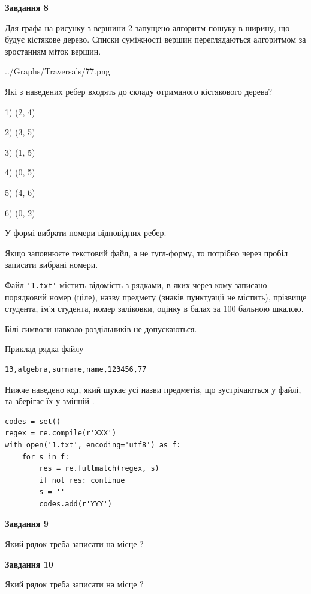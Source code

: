 \documentclass[12pt, ukrainian]{article}
\def\code#1{\Verb!#1!}
\begin{document}
{\begin {large}
{\begin {center}\textbf{Завдання 8}\end {center}}\par
Для графа на рисунку з вершини 2 запущено алгоритм пошуку в ширину, що будує кістякове дерево. Списки суміжності вершин переглядаються алгоритмом за зростанням міток вершин.\par
\begin{center}
	{../Graphs/Traversals/77.png}
\end{center}
\par Які з наведених ребер входять до складу отриманого кістякового дерева?\par
1) (2, 4)\par
2) (3, 5)\par
3) (1, 5)\par
4) (0, 5)\par
5) (4, 6)\par
6) (0, 2)\par
{\vskip 15pt} У формі вибрати номери відповідних ребер.


Якщо заповнюєте текстовий файл, а не гугл-форму, то потрібно через пробіл записа\-ти вибрані номери.\par
\newpage


Файл \code{'1.txt'} містить відомість з рядками, в яких через кому записано поряд\-ковий номер (ціле), назву предмету (знаків пунктуації не містить), прізвище студента, ім'я студента, номер заліковки, оцінку в балах за 100 бальною шкалою.

Білі символи навколо роздільників не допускаються.

Приклад рядка файлу



\begin{verbatim}
13,algebra,surname,name,123456,77
\end{verbatim}


Нижче наведено код, який шукає усі назви предметів, що зустрічаються у файлі, та зберігає їх у змінній .



\begin{verbatim}
codes = set()
regex = re.compile(r'XXX')
with open('1.txt', encoding='utf8') as f:
    for s in f:
        res = re.fullmatch(regex, s)
        if not res: continue
        s = ''
        codes.add(r'YYY')
\end{verbatim}


{\begin {center}\textbf{Завдання 9}\end {center}}\par
Який рядок треба записати на місце  ?\par
\vspace{5mm}


{\begin {center}\textbf{Завдання 10}\end {center}}\par
Який рядок треба записати на місце  ?\par


\newpage


\end {large}}
\end{document}
